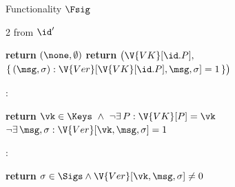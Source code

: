 \begin{interface}[nofloat]{Functionality $\Fsig$ \\
\params{$\PID$, \quad $\Ps$, \quad $\admits$, \quad
$\uses := \{(\Adv,\serves)\}$, \quad $\pars := \none$}}
{\begin{multicols}{2}
 \quad from $\id'$
\begin{algorithmic}[1]
\algcont
{}
  \State \textbf{return} $(\none, \emptyset)$
\EndIf
\State \textbf{return} $\bigl(\V{VK}[\id.P],$
\Statex \quad\ $\{\, (\msg,\sigma) : \V{Ver}[\V{VK}[\id.P],\msg,\sigma] = 1 \,\}\bigr)$
\algsave
\end{algorithmic}
\vspace{1.4ex}

:
\begin{algorithmic}[1]
\algcont
\State \textbf{return} $\vk \in \Keys \ \wedge\ \neg\exists\, P : \V{VK}[P] = \vk$
\State \algand\ $\neg\exists\, \msg,\sigma : \V{Ver}[\vk,\msg,\sigma] = 1$
\algsave
\end{algorithmic}
\vspace{1.4ex}

:
\begin{algorithmic}[1]
\algcont
\State \textbf{return} $\sigma \in \Sigs \wedge \V{Ver}[\vk,\msg,\sigma] \neq 0$
\algsave
\end{algorithmic}
\end{multicols}}
\end{interface}
